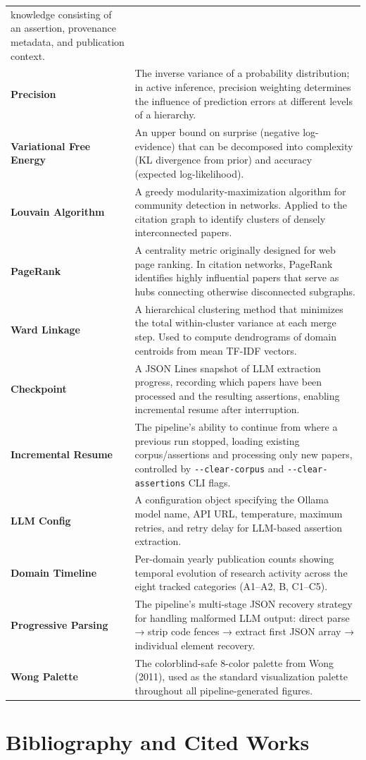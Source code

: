 \documentclass[
]{article}
\begin{document}
{\begin{longtable}[]{@{}
  >{\raggedright\arraybackslash}p{}
  >{\raggedright\arraybackslash}p{}@{}}
knowledge consisting of an assertion, provenance metadata, and
publication context. \\
\textbf{Precision} & The inverse variance of a probability distribution;
in active inference, precision weighting determines the influence of
prediction errors at different levels of a hierarchy. \\
\textbf{Variational Free Energy} & An upper bound on surprise (negative
log-evidence) that can be decomposed into complexity (KL divergence from
prior) and accuracy (expected log-likelihood). \\
\textbf{Louvain Algorithm} & A greedy modularity-maximization algorithm
for community detection in networks. Applied to the citation graph to
identify clusters of densely interconnected papers. \\
\textbf{PageRank} & A centrality metric originally designed for web page
ranking. In citation networks, PageRank identifies highly influential
papers that serve as hubs connecting otherwise disconnected
subgraphs. \\
\textbf{Ward Linkage} & A hierarchical clustering method that minimizes
the total within-cluster variance at each merge step. Used to compute
dendrograms of domain centroids from mean TF-IDF vectors. \\
\textbf{Checkpoint} & A JSON Lines snapshot of LLM extraction progress,
recording which papers have been processed and the resulting assertions,
enabling incremental resume after interruption. \\
\textbf{Incremental Resume} & The pipeline's ability to continue from
where a previous run stopped, loading existing corpus/assertions and
processing only new papers, controlled by \texttt{-\/-clear-corpus} and
\texttt{-\/-clear-assertions} CLI flags. \\
\textbf{LLM Config} & A configuration object specifying the Ollama model
name, API URL, temperature, maximum retries, and retry delay for
LLM-based assertion extraction. \\
\textbf{Domain Timeline} & Per-domain yearly publication counts showing
temporal evolution of research activity across the eight tracked
categories (A1--A2, B, C1--C5). \\
\textbf{Progressive Parsing} & The pipeline's multi-stage JSON recovery
strategy for handling malformed LLM output: direct parse → strip code
fences → extract first JSON array → individual element recovery. \\
\textbf{Wong Palette} & The colorblind-safe 8-color palette from Wong
(2011), used as the standard visualization palette throughout all
pipeline-generated figures. \\
\end{longtable}
}

\newpage

\section{Bibliography and Cited
Works}\label{bibliography-and-cited-works}



\end{document}
